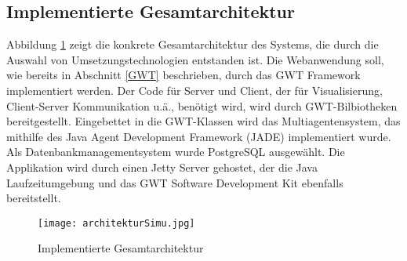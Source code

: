 \subsection{Implementierte Gesamtarchitektur}
Abbildung \ref{GAI} zeigt die konkrete Gesamtarchitektur des Systems, die durch die Auswahl von Umsetzungstechnologien entstanden ist. Die Webanwendung soll, wie bereits in Abschnitt \ref{GWT} beschrieben, durch das GWT Framework implementiert werden. Der Code für Server und Client, der für Visualisierung, Client-Server Kommunikation u.ä., benötigt wird, wird durch GWT-Bilbiotheken bereitgestellt. Eingebettet in die GWT-Klassen wird das Multiagentensystem, das mithilfe des Java Agent Development Framework (JADE) implementiert wurde. Als Datenbankmanagementsystem wurde PostgreSQL ausgewählt. Die Applikation wird durch einen Jetty Server gehostet, der die Java Laufzeitumgebung und das GWT Software Development Kit ebenfalls bereitstellt.  
\begin{figure}[h!]
	\centering
		\texttt{[image: architekturSimu.jpg]}        
		\caption{Implementierte Gesamtarchitektur}
	\label{GAI}
\end{figure}